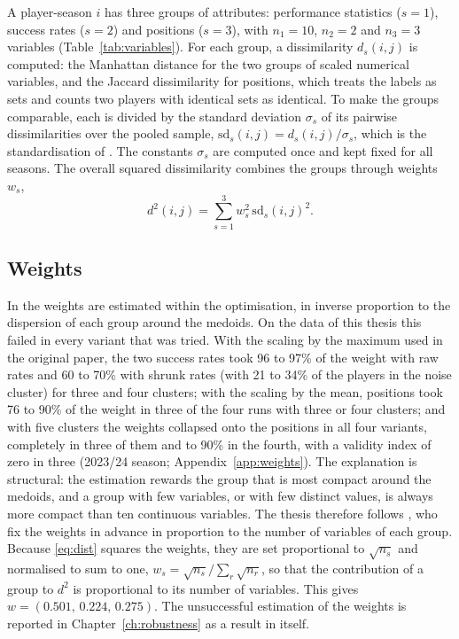A player-season $i$ has three groups of attributes: performance statistics ($s=1$), success rates ($s=2$) and positions ($s=3$), with $n_1=10$, $n_2=2$ and $n_3=3$ variables (Table~\ref{tab:variables}). For each group, a dissimilarity $d_s(i,j)$ is computed: the Manhattan distance for the two groups of scaled numerical variables, and the Jaccard dissimilarity for positions, which treats the labels as sets and counts two players with identical sets as identical. To make the groups comparable, each is divided by the standard deviation $\sigma_s$ of its pairwise dissimilarities over the pooled sample, $\mathrm{sd}_s(i,j)=d_s(i,j)/\sigma_s$, which is the standardisation of . The constants $\sigma_s$ are computed once and kept fixed for all seasons. The overall squared dissimilarity combines the groups through weights $w_s$,
\begin{equation}
	d^2(i,j)=\sum_{s=1}^{3} w_s^{2}\,\mathrm{sd}_s(i,j)^2 .
	\label{eq:dist}
\end{equation}

\subsection{Weights}

In  the weights are estimated within the optimisation, in inverse proportion to the dispersion of each group around the medoids. On the data of this thesis this failed in every variant that was tried. With the scaling by the maximum used in the original paper, the two success rates took 96 to 97\% of the weight with raw rates and 60 to 70\% with shrunk rates (with 21 to 34\% of the players in the noise cluster) for three and four clusters; with the scaling by the mean, positions took 76 to 90\% of the weight in three of the four runs with three or four clusters; and with five clusters the weights collapsed onto the positions in all four variants, completely in three of them and to 90\% in the fourth, with a validity index of zero in three (2023/24 season; Appendix~\ref{app:weights}). The explanation is structural: the estimation rewards the group that is most compact around the medoids, and a group with few variables, or with few distinct values, is always more compact than ten continuous variables. The thesis therefore follows , who fix the weights in advance in proportion to the number of variables of each group. Because \eqref{eq:dist} squares the weights, they are set proportional to $\sqrt{n_s}$ and normalised to sum to one, $w_s=\sqrt{n_s}/\sum_r\sqrt{n_r}$, so that the contribution of a group to $d^2$ is proportional to its number of variables. This gives $w=(0.501,\,0.224,\,0.275)$. The unsuccessful estimation of the weights is reported in Chapter~\ref{ch:robustness} as a result in itself.

